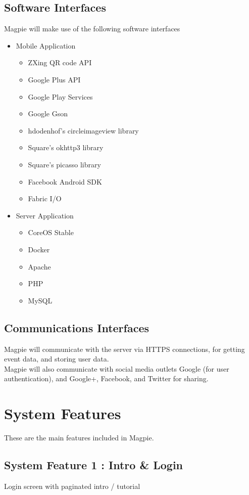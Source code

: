 \documentclass{scrreprt}
\begin{document}
\section{Software Interfaces}
Magpie will make use of the following software interfaces
\begin{itemize}
  \item Mobile Application
  \begin{itemize}
    \item ZXing QR code API
    \item Google Plus API
    \item Google Play Services
    \item Google Gson
    \item hdodenhof's circleimageview library
    \item Square's okhttp3 library
    \item Square's picasso library
    \item Facebook Android SDK
    \item Fabric I/O
  \end{itemize}
  \item Server Application
  \begin{itemize}
    \item CoreOS Stable
    \item Docker
    \item Apache
    \item PHP
    \item MySQL
  \end{itemize}
\end{itemize}

\section{Communications Interfaces}
Magpie will communicate with the server via HTTPS connections, for getting event
data, and storing user data. \\
Magpie will also communicate with social media outlets Google (for user authentication),
and Google+, Facebook, and Twitter for sharing.

\chapter{System Features}
These are the main features included in Magpie.

\section{System Feature 1 : Intro \& Login}
Login screen with paginated intro / tutorial
\end{document}
